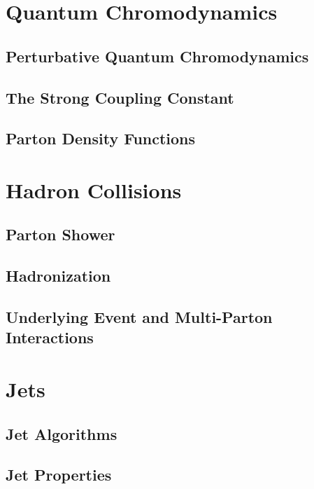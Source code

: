 \section{Quantum Chromodynamics}
\subsection{Perturbative Quantum Chromodynamics}
\subsection{The Strong Coupling Constant}
\subsection{Parton Density Functions}

\section{Hadron Collisions}
\subsection{Parton Shower}
\subsection{Hadronization}
\subsection{Underlying Event and Multi-Parton Interactions}

\section{Jets}
\label{sec:jets}
\subsection{Jet Algorithms}
\label{sec:jet_algos}

\subsection{Jet Properties}

\cleardoublepage

